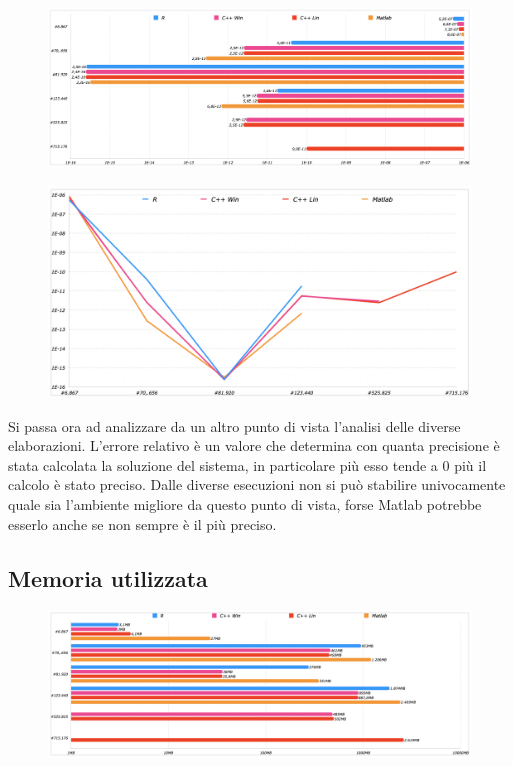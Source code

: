 \documentclass[preprint,12pt]{elsarticle}
\begin{document}
\begin{figure}[H]
	\centering
	\includegraphics[width=\linewidth]{errore1}
\end{figure}

\begin{figure}[H]
	\centering
	\includegraphics[width=\linewidth]{errore2}
\end{figure}

Si passa ora ad analizzare da un altro punto di vista l'analisi delle diverse elaborazioni. L'errore relativo è un valore che determina con quanta precisione è stata calcolata la soluzione del sistema, in particolare più esso tende a 0 più il calcolo è stato preciso.
Dalle diverse esecuzioni non si può stabilire univocamente quale sia l'ambiente migliore da questo punto di vista, forse Matlab potrebbe esserlo anche se non sempre è il più preciso.

\subsection{Memoria utilizzata}

\begin{figure}[H]
	\centering
	\includegraphics[width=\linewidth]{memoria1}
\end{figure}
\end{document}
